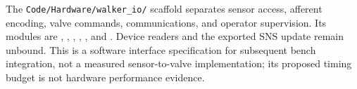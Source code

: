 The \nolinkurl{Code/Hardware/walker_io/} scaffold separates sensor access, afferent encoding, valve commands, communications, and operator supervision. Its modules are , , , , , and . Device readers and the exported SNS update remain unbound. This is a software interface specification for subsequent bench integration, not a measured sensor-to-valve implementation; its proposed timing budget is not hardware performance evidence.
